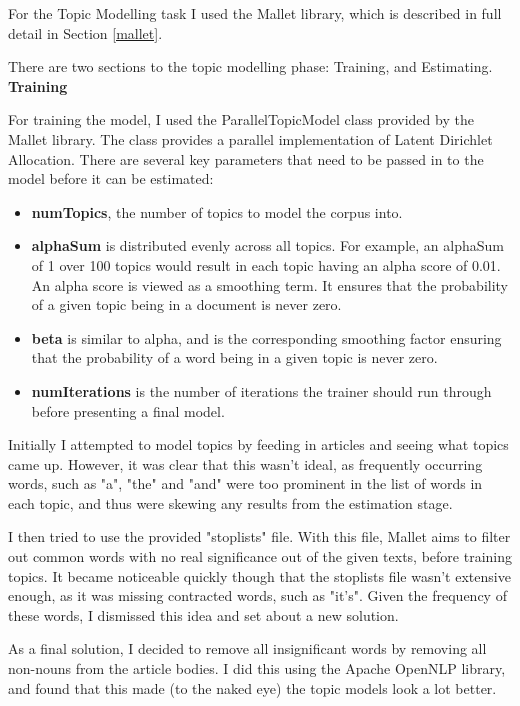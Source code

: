 \documentclass[12pt]{article}
\begin{document}
\label{tm}

For the Topic Modelling task I used the Mallet library, which is described in full detail in Section \ref{mallet}.

There are two sections to the topic modelling phase: Training, and Estimating. \\

\textbf{Training}

For training the model, I used the ParallelTopicModel class provided by the Mallet library. The class provides a parallel implementation of Latent Dirichlet Allocation. There are several key parameters that need to be passed in to the model before it can be estimated:

\begin{itemize}
	\item \textbf{numTopics}, the number of topics to model the corpus into.
	\item \textbf{alphaSum} is distributed evenly across all topics. For example, an alphaSum of 1 over 100 topics would result in each topic having an alpha score of 0.01. An alpha score is viewed as a smoothing term. It ensures that the probability of a given topic being in a document is never zero.
	\item \textbf{beta} is similar to alpha, and is the corresponding smoothing factor ensuring that the probability of a word being in a given topic is never zero.
	\item \textbf{numIterations} is the number of iterations the trainer should run through before presenting a final model.
\end{itemize}

Initially I attempted to model topics by feeding in articles and seeing what topics came up. However, it was clear that this wasn't ideal, as frequently occurring words, such as "a", "the" and "and" were too prominent in the list of words in each topic, and thus were skewing any results from the estimation stage.

I then tried to use the provided "stoplists" file. With this file, Mallet aims to filter out common words with no real significance out of the given texts, before training topics. It became noticeable quickly though that the stoplists file wasn't extensive enough, as it was missing contracted words, such as "it's". Given the frequency of these words, I dismissed this idea and set about a new solution.

As a final solution, I decided to remove all insignificant words by removing all non-nouns from the article bodies. I did this using the Apache OpenNLP library, and found that this made (to the naked eye) the topic models look a lot better. 
\end{document}
